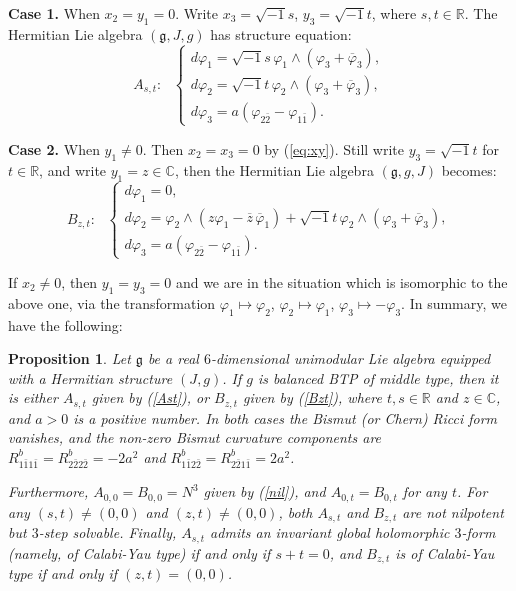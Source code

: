 \documentclass{amsart}
\numberwithin{equation}{section}
\newtheorem{proposition}[theorem]{Proposition}
\theoremstyle{definition}
\renewcommand{\1}{\mathds{1}}
\renewcommand{\>}{\rightarrow}
\begin{document}

{\bf Case 1.} When $x_2=y_1=0$. Write $x_3=\sqrt{-1}s$, $y_3=\sqrt{-1}t$, where $s,t\in {\mathbb R}$. The Hermitian Lie algebra $({\mathfrak g}, J,g)$ has structure equation:
\begin{equation} \label{Ast}
A_{s,t}: \ \ \ \left\{ \begin{array}{lll} d\varphi_1 = \sqrt{-1}s \,\varphi_1\wedge (\varphi_3 + \overline{\varphi}_3), \\
d\varphi_2 = \sqrt{-1}t \,\varphi_2\wedge (\varphi_3 + \overline{\varphi}_3), \\
d\varphi_3 = a(\varphi_{2\bar{2}} - \varphi_{1\bar{1}} ).  \end{array} \right.
\end{equation}

{\bf Case 2.} When $y_1\neq 0$. Then $x_2=x_3=0$ by (\ref{eq:xy}). Still write $y_3=\sqrt{-1}t$ for $t\in {\mathbb R}$, and write $y_1=z\in {\mathbb C}$, then the Hermitian Lie algebra $({\mathfrak g}, g,J)$ becomes:
\begin{equation} \label{Bzt}
B_{z,t}: \ \ \ \left\{ \begin{array}{lll} d\varphi_1 = 0, \\
d\varphi_2 = \varphi_2 \wedge (z\varphi_1 - \overline{z}\,\overline{\varphi}_1) +\sqrt{-1}t \,\varphi_2\wedge (\varphi_3 + \overline{\varphi}_3), \\
d\varphi_3 = a (\varphi_{2\bar{2}} - \varphi_{1\bar{1}} ).  \end{array} \right.
\end{equation}

If $x_2\neq 0$, then $y_1=y_3=0$ and we are in the situation which is isomorphic to the above one,  via the transformation $\varphi_1 \mapsto \varphi_2$, $\varphi_2\mapsto \varphi_1$, $\varphi_3 \mapsto -\varphi_3$. In summary, we have the following:

\begin{proposition} \label{LieHermitian}
Let ${\mathfrak g}$ be a real $6$-dimensional unimodular Lie algebra equipped with a Hermitian structure $(J,g)$. If $g$ is balanced BTP of middle type, then it is either $A_{s,t}$ given by (\ref{Ast}), or $B_{z,t}$ given by (\ref{Bzt}), where $t,s\in {\mathbb R}$ and $z\in {\mathbb C}$, and $a>0$ is a positive number. In both cases the Bismut (or Chern) Ricci form vanishes, and the non-zero Bismut curvature components are $R^b_{1\bar{1}1\bar{1}}=R^b_{2\bar{2}2\bar{2}}=-2a^2$ and $R^b_{1\bar{1}2\bar{2}}=R^b_{2\bar{2}1\bar{1}}=2a^2$.

Furthermore, $A_{0,0}=B_{0,0}=N^3$ given by (\ref{nil}), and $A_{0,t}=B_{0,t}$ for any $t$. For any $(s,t)\neq (0,0)$ and $(z,t)\neq (0,0)$, both $A_{s,t}$ and $B_{z,t}$ are not nilpotent but $3$-step solvable. Finally, $A_{s,t}$ admits an invariant global holomorphic $3$-form (namely, of Calabi-Yau type) if and only if $s+t=0$, and $B_{z,t}$ is of Calabi-Yau type if and only if $(z,t)=(0,0)$.
\end{proposition}
\end{document}
